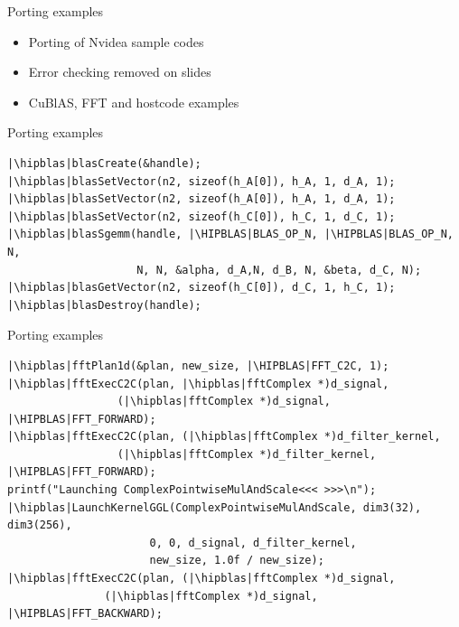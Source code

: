 \documentclass[aspectratio=169]{beamer}
\newcommand{\hipblas}{\sout{\color{red}{cu}}\textbf{\color{green}{hip}}}
\newcommand{\HIPBLAS}{\sout{\color{red}{CU}}\textbf{\color{green}{HIP}}}
\begin{document}
\begin{frame}[fragile]{Porting examples}
\begin{itemize}
    \item Porting of Nvidea sample codes
    \item Error checking removed on slides
    \item CuBlAS, FFT and hostcode examples
    
\end{itemize}

\end{frame}


\begin{frame}[fragile]{Porting examples}
\begin{verbatim}
|\hipblas|blasCreate(&handle);
|\hipblas|blasSetVector(n2, sizeof(h_A[0]), h_A, 1, d_A, 1);
|\hipblas|blasSetVector(n2, sizeof(h_A[0]), h_A, 1, d_A, 1);
|\hipblas|blasSetVector(n2, sizeof(h_C[0]), h_C, 1, d_C, 1);
|\hipblas|blasSgemm(handle, |\HIPBLAS|BLAS_OP_N, |\HIPBLAS|BLAS_OP_N, N, 
                    N, N, &alpha, d_A,N, d_B, N, &beta, d_C, N);
|\hipblas|blasGetVector(n2, sizeof(h_C[0]), d_C, 1, h_C, 1);
|\hipblas|blasDestroy(handle);
\end{verbatim}
\end{frame}

\begin{frame}[fragile]{Porting examples}
\begin{verbatim}
|\hipblas|fftPlan1d(&plan, new_size, |\HIPBLAS|FFT_C2C, 1);
|\hipblas|fftExecC2C(plan, |\hipblas|fftComplex *)d_signal,
                 (|\hipblas|fftComplex *)d_signal, |\HIPBLAS|FFT_FORWARD);
|\hipblas|fftExecC2C(plan, (|\hipblas|fftComplex *)d_filter_kernel,
                 (|\hipblas|fftComplex *)d_filter_kernel, |\HIPBLAS|FFT_FORWARD);
printf("Launching ComplexPointwiseMulAndScale<<< >>>\n");
|\hipblas|LaunchKernelGGL(ComplexPointwiseMulAndScale, dim3(32), dim3(256),
                      0, 0, d_signal, d_filter_kernel,
                      new_size, 1.0f / new_size);
|\hipblas|fftExecC2C(plan, (|\hipblas|fftComplex *)d_signal,
               (|\hipblas|fftComplex *)d_signal, |\HIPBLAS|FFT_BACKWARD);
\end{verbatim}
\end{frame}
\end{document}
